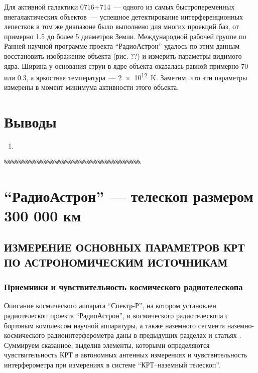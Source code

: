 Для активной галактики 0716+714~--- одного из самых быстропеременных внегалактических объектов~---
успешное детектирование интерференционных лепестков в том же диапазоне было выполнено для многих
проекций баз, от примерно 1.5 до более 5 диаметров Земли. Международной рабочей группе по Ранней
научной программе проекта ``РадиоАстрон'' удалось по этим данным восстановить изображение объекта
(рис. ??) и измерить параметры видимого ядра. Ширина у основания струи в ядре объекта оказалась
равной примерно \SI{70}{\uas} или \SI{0.3}{\parsec}, а яркостная температура~--- \SI{2e12}{\kelvin}.
Заметим, что эти параметры измерены в момент минимума активности этого объекта.

\section{Выводы}

\begin{enumerate}
 \item
\end{enumerate}


\begin{verbatim}
%%%%%%%%%%%%%%%%%%%%%%%%%%%%%%%%%%%%%%
\end{verbatim}


\section{``РадиоАстрон'' --- телескоп размером 300 000 км}

\subsection{ИЗМЕРЕНИЕ ОСНОВНЫХ ПАРАМЕТРОВ КРТ
         ПО АСТРОНОМИЧЕСКИМ ИСТОЧНИКАМ}

\subsubsection{Приемники и чувствительность космического радиотелескопа}

Описание космического аппарата ``Спектр-Р'',
на котором установлен радиотелескоп проекта ``РадиоАстрон'', и
космического радиотелескопа с бортовым комплексом научной
аппаратуры, а также наземного сегмента наземно-космического
радиоинтерферометра даны в предыдущих разделах и статьях
\cite{}.
Суммируем сказанное, выделив элементы, которыми определяются
чувствительность КРТ в автономных антенных измерениях и
чувствительность интерферометра при измерениях в системе
``КРТ--наземный телескоп''.

